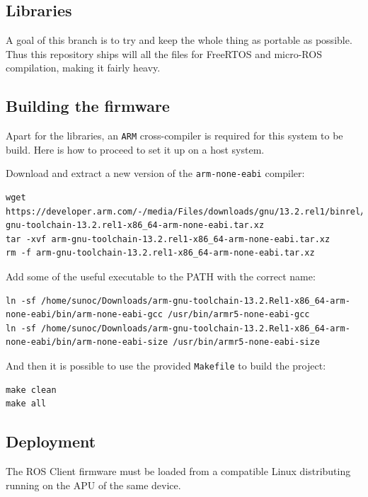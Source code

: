 \documentclass[10pt]{article}
\begin{document}
\subsection{Libraries}
\label{sec:org61f4e33}
A goal of this branch is to try and keep the whole thing as portable as possible.
Thus this repository ships will all the files for FreeRTOS and micro-ROS compilation,
making it fairly heavy.

\subsection{Building the firmware}
\label{sec:org5d75d70}
Apart for the libraries, an \texttt{ARM} cross-compiler is required for this system to be
build. Here is how to proceed to set it up on a host system.

Download and extract a new version of the \texttt{arm-none-eabi} compiler:
\begin{verbatim}
wget https://developer.arm.com/-/media/Files/downloads/gnu/13.2.rel1/binrel/arm-gnu-toolchain-13.2.rel1-x86_64-arm-none-eabi.tar.xz
tar -xvf arm-gnu-toolchain-13.2.rel1-x86_64-arm-none-eabi.tar.xz
rm -f arm-gnu-toolchain-13.2.rel1-x86_64-arm-none-eabi.tar.xz
\end{verbatim}

Add some of the useful executable to the PATH with the correct name:
\begin{verbatim}
ln -sf /home/sunoc/Downloads/arm-gnu-toolchain-13.2.Rel1-x86_64-arm-none-eabi/bin/arm-none-eabi-gcc /usr/bin/armr5-none-eabi-gcc
ln -sf /home/sunoc/Downloads/arm-gnu-toolchain-13.2.Rel1-x86_64-arm-none-eabi/bin/arm-none-eabi-size /usr/bin/armr5-none-eabi-size
\end{verbatim}

And then it is possible to use the provided \texttt{Makefile} to build the project:
\begin{verbatim}
make clean
make all
\end{verbatim}

\subsection{Deployment}
\label{sec:org901ff20}
The ROS Client firmware must be loaded from a compatible Linux distributing
running on the APU of the same device.
\end{document}
